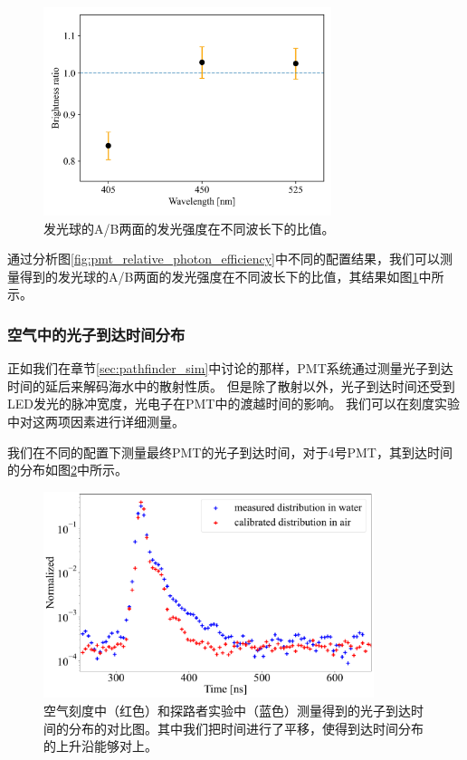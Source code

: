 \begin{figure}[!ht]
    \centering
    \includegraphics[width = 0.75\textwidth]{img/led_brightness_ratio.jpg}
    \caption{发光球的A/B两面的发光强度在不同波长下的比值。}
    \label{fig:led_brightness_ratio}
\end{figure}

通过分析图\ref{fig:pmt_relative_photon_efficiency}中不同的配置结果，我们可以测量得到的发光球的A/B两面的发光强度在不同波长下的比值，其结果如图\ref{fig:led_brightness_ratio}中所示。




\subsubsection{空气中的光子到达时间分布}

正如我们在章节\ref{sec:pathfinder_sim}中讨论的那样，PMT系统通过测量光子到达时间的延后来解码海水中的散射性质。
但是除了散射以外，光子到达时间还受到LED发光的脉冲宽度，光电子在PMT中的渡越时间的影响。
我们可以在刻度实验中对这两项因素进行详细测量。

我们在不同的配置下测量最终PMT的光子到达时间，对于4号PMT，其到达时间的分布如图\ref{fig:pmt_arrival_time_distribution_cali}中所示。

\begin{figure}[htb]
    \centering
    \includegraphics[width=0.86\textwidth]{img/pmt_arrival_time_distribution_cali.pdf}
    \caption{空气刻度中（红色）和探路者实验中（蓝色）测量得到的光子到达时间的分布的对比图。其中我们把时间进行了平移，使得到达时间分布的上升沿能够对上。}
    \label{fig:pmt_arrival_time_distribution_cali}
\end{figure}


